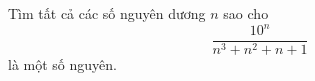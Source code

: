 \ifshowproblem
\begin{problem}\label{example:JPN-2015-MO-P1}
	Tìm tất cả các số nguyên dương \( n \) sao cho 
	\[
		\frac{10^n}{n^3 + n^2 + n + 1}
	\]
	là một số nguyên.
\end{problem}
\fi

\fi